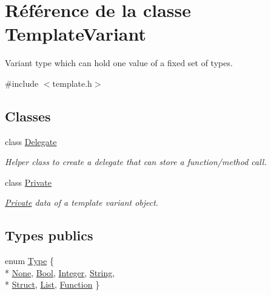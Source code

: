 \hypertarget{class_template_variant}{}\section{Référence de la classe Template\+Variant}
\label{class_template_variant}


Variant type which can hold one value of a fixed set of types.  




{\ttfamily \#include $<$template.\+h$>$}

\subsection*{Classes}
\begin{DoxyCompactItemize}
\item 
class \hyperlink{class_template_variant_1_1_delegate}{Delegate}
\begin{DoxyCompactList}\small\item\em Helper class to create a delegate that can store a function/method call. \end{DoxyCompactList}\item 
class \hyperlink{class_template_variant_1_1_private}{Private}
\begin{DoxyCompactList}\small\item\em \hyperlink{class_template_variant_1_1_private}{Private} data of a template variant object. \end{DoxyCompactList}\end{DoxyCompactItemize}
\subsection*{Types publics}
\begin{DoxyCompactItemize}
\item 
enum \hyperlink{group__template__api_ga4c0d322ba971480bfbd2a8f418eadc81}{Type} \{ \\*
\hyperlink{group__template__api_gga4c0d322ba971480bfbd2a8f418eadc81ac64bfef699f6847ca4a1589b5057a943}{None}, 
\hyperlink{group__template__api_gga4c0d322ba971480bfbd2a8f418eadc81aaa4ac74b26768c0a9aae405dc0ab4291}{Bool}, 
\hyperlink{group__template__api_gga4c0d322ba971480bfbd2a8f418eadc81af502b2f0adb48b330d54c141ab7d6b17}{Integer}, 
\hyperlink{group__template__api_gga4c0d322ba971480bfbd2a8f418eadc81a97c566900c9dce7f38cb2c1fd9e6890d}{String}, 
\\*
\hyperlink{group__template__api_gga4c0d322ba971480bfbd2a8f418eadc81a95bec7591d52d9a3e93851d6cb6f3064}{Struct}, 
\hyperlink{group__template__api_gga4c0d322ba971480bfbd2a8f418eadc81a06b8f56fd37b6285112638c331f29252}{List}, 
\hyperlink{group__template__api_gga4c0d322ba971480bfbd2a8f418eadc81afa78594f4b9f7fa93f71ef39deae0323}{Function}
 \}
\end{DoxyCompactItemize}
